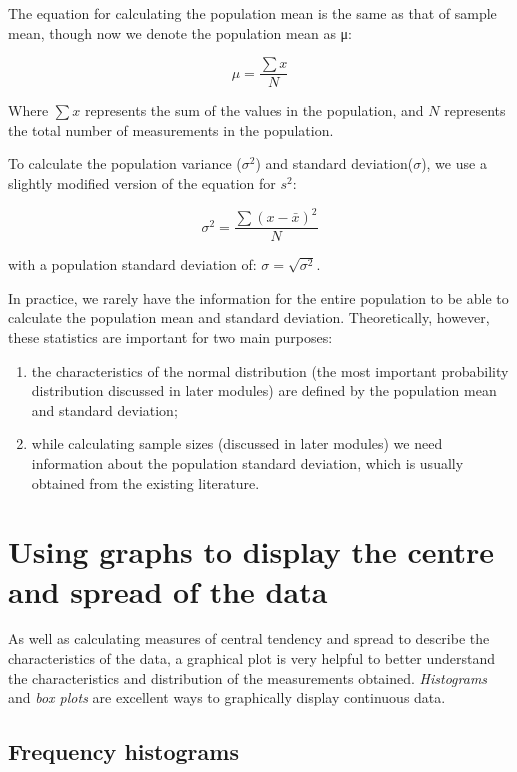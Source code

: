 \documentclass[
]{memoir}
\providecommand{\tightlist}{%
  \setlength{\itemsep}{0pt}\setlength{\parskip}{0pt}}
\begin{document}
The equation for calculating the population mean is the same as that of sample mean, though now we denote the population mean as μ:

\[ \mu = \frac{\sum{x}}{N} \]

Where \(\sum{x}\) represents the sum of the values in the population, and \(N\) represents the total number of measurements in the population.

To calculate the population variance (\(\sigma^2\)) and standard deviation(\(\sigma\)), we use a slightly modified version of the equation for \(s^2\):

\[ \sigma^2 = \frac{\sum(x - \bar{x})^2}{N} \]

with a population standard deviation of: \(\sigma = \sqrt{\sigma^2}\).

In practice, we rarely have the information for the entire population to be able to calculate the population mean and standard deviation. Theoretically, however, these statistics are important for two main purposes:

\begin{enumerate}
\def\labelenumi{\arabic{enumi}.}
\tightlist
\item
  the characteristics of the normal distribution (the most important probability distribution discussed in later modules) are defined by the population mean and standard deviation;
\item
  while calculating sample sizes (discussed in later modules) we need information about the population standard deviation, which is usually obtained from the existing literature.
\end{enumerate}

\hypertarget{using-graphs-to-display-the-centre-and-spread-of-the-data}{%
\section{Using graphs to display the centre and spread of the data}\label{using-graphs-to-display-the-centre-and-spread-of-the-data}}

As well as calculating measures of central tendency and spread to describe the characteristics of the data, a graphical plot is very helpful to better understand the characteristics and distribution of the measurements obtained. \emph{Histograms} and \emph{box plots} are excellent ways to graphically display continuous data.

\hypertarget{frequency-histograms}{%
\subsection{Frequency histograms}\label{frequency-histograms}}
\end{document}
